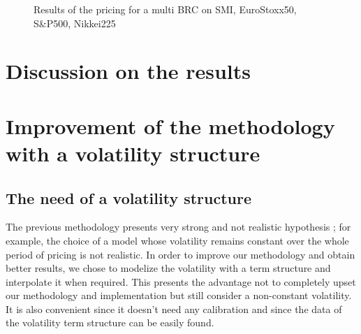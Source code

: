 \documentclass[a4paper,11pt,english]{book}
\begin{document}
\begin{figure}[H]
\begin{center}
    \label{brc-smi-eurostoxx-sp500-nikkei}
    \caption{Results of the pricing for a multi BRC on SMI, EuroStoxx50, S\&P500, Nikkei225}
\end{center}
\end{figure}

\section{Discussion on the results}

\section{Improvement of the methodology with a volatility structure}
\subsection{The need of a volatility structure}
The previous methodology presents very strong and not realistic hypothesis ; for example, the choice of a model whose volatility remains constant over the whole period of pricing is not realistic. In order to improve our methodology and obtain better results, we chose to modelize the volatility with a term structure and interpolate it when required. This presents the advantage not to completely upset our methodology and implementation but still consider a non-constant volatility. It is also convenient since it doesn't need any calibration and since the data of the volatility term structure can be easily found.
\end{document}
